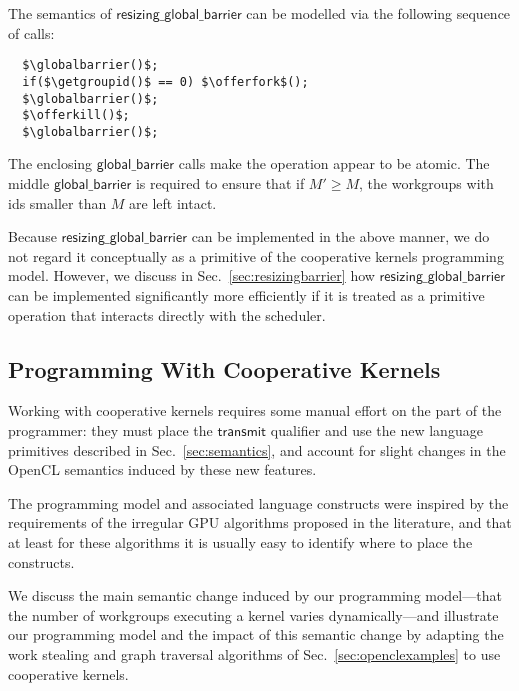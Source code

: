 \documentclass[numbers,nocopyrightspace,10pt]{sigplanconf}
\newcommand{\mysec}{Sec.~}
\newcommand{\transmit}{\mathsf{transmit}}
\newcommand{\offerfork}{\mathsf{offer\_fork}}
\newcommand{\offerkill}{\mathsf{offer\_kill}}
\newcommand{\globalbarrier}{\mathsf{global\_barrier}}
\newcommand{\resizingglobalbarrier}{\mathsf{resizing\_global\_barrier}}
\newcommand{\getgroupid}{\mathsf{get\_group\_id}}
\begin{document}
The semantics of $\resizingglobalbarrier$ can be modelled via the following sequence of calls:

\lstset{basicstyle=\tt,numbers=none}
\begin{lstlisting}
  $\globalbarrier()$;
  if($\getgroupid()$ == 0) $\offerfork$();
  $\globalbarrier()$;
  $\offerkill()$;
  $\globalbarrier()$;
\end{lstlisting}
\lstset{basicstyle=\scriptsize\tt,numbers=left}

The enclosing $\globalbarrier$ calls make the operation appear to be
atomic.  The middle $\globalbarrier$ is required to ensure that if
$M'\geq M$, the workgroups with ids smaller than $M$ are left intact.

Because $\resizingglobalbarrier$ can be implemented in the above
manner, we do not regard it conceptually as a primitive of the
cooperative kernels programming model.  However, we discuss in
\mysec\ref{sec:resizingbarrier} how $\resizingglobalbarrier$ can be
implemented significantly more efficiently if it is treated as a
primitive operation that interacts directly with the scheduler.

\subsection{Programming With Cooperative Kernels}\label{sec:programmingguidelines}

Working with cooperative kernels requires some manual effort on the
part of the programmer: they must place the $\transmit$ qualifier and
use the new language primitives described in
\mysec\ref{sec:semantics}, and account for slight changes in the OpenCL semantics induced by these new features.

The programming model and associated language constructs were inspired
by the requirements of the irregular GPU algorithms proposed in the
literature, and that at least for these algorithms it is usually easy
to identify where to place the constructs.

We discuss the main semantic change induced by our programming
model---that the number of workgroups executing a kernel varies
dynamically---and illustrate our programming model and the impact of
this semantic change by adapting the work stealing and graph traversal
algorithms of \mysec\ref{sec:openclexamples} to use cooperative
kernels.
\end{document}
